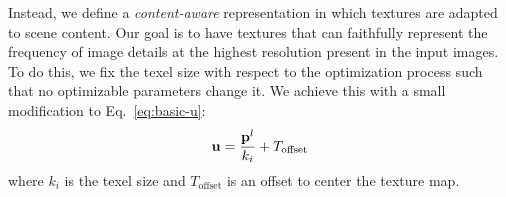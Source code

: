 Instead, we define a \emph{content-aware} representation in which textures are adapted to scene content. 
Our goal is to have textures that can faithfully represent the frequency of image details at the highest resolution present in the input images.
To do this, we fix the texel size with respect to the optimization process such that no optimizable parameters change it. We achieve this with a small modification to Eq.~\ref{eq:basic-u}:
\begin{equation}
    \mathbf{u} = \frac{\mathbf{p}^l}{k_i} + T_\text{offset}
\end{equation}
\noindent
where $k_i$ is the texel size and $T_\text{offset}$ is an offset to center the texture map.


